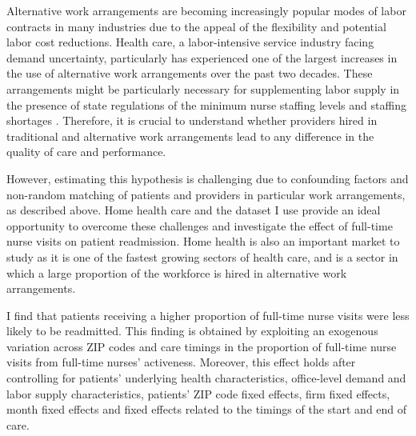 \documentclass[final,12pt]{article}
\begin{document}
Alternative work arrangements are becoming increasingly popular modes of labor contracts in many industries due to the appeal of the flexibility and potential labor cost reductions.
Health care, a labor-intensive service industry facing demand uncertainty, particularly has experienced one of the largest increases in the use of alternative work arrangements over the past two decades.
These arrangements might be particularly necessary for supplementing labor supply in the presence of state regulations of the minimum nurse staffing levels and staffing shortages \citep{Tong2011, Cook2012, Mark2013, Lin2014, Matsudaira2014}.
Therefore, it is crucial to understand whether providers hired in traditional and alternative work arrangements lead to any difference in the quality of care and performance.

However, estimating this hypothesis is challenging due to confounding factors and non-random matching of patients and providers in particular work arrangements, as described above.
Home health care and the dataset I use provide an ideal opportunity to overcome these challenges and investigate the effect of full-time nurse visits on patient readmission.
Home health is also an important market to study as it is one of the fastest growing sectors of health care, and is a sector in which a large proportion of the workforce is hired in alternative work arrangements.

I find that patients receiving a higher proportion of full-time nurse visits were less likely to be readmitted.
This finding is obtained by exploiting an exogenous variation across ZIP codes and care timings in the proportion of full-time nurse visits from full-time nurses' activeness.
Moreover, this effect holds after controlling for patients' underlying health characteristics, office-level demand and labor supply characteristics, patients' ZIP code fixed effects, firm fixed effects, month fixed effects and fixed effects related to the timings of the start and end of care.
\end{document}
